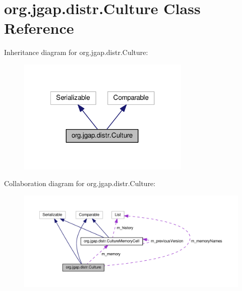 \hypertarget{classorg_1_1jgap_1_1distr_1_1_culture}{\section{org.\-jgap.\-distr.\-Culture Class Reference}
\label{classorg_1_1jgap_1_1distr_1_1_culture}
}


Inheritance diagram for org.\-jgap.\-distr.\-Culture\-:
\nopagebreak
\begin{figure}[H]
\begin{center}
\leavevmode
\includegraphics[width=233pt]{classorg_1_1jgap_1_1distr_1_1_culture__inherit__graph}
\end{center}
\end{figure}


Collaboration diagram for org.\-jgap.\-distr.\-Culture\-:
\nopagebreak
\begin{figure}[H]
\begin{center}
\leavevmode
\includegraphics[width=350pt]{classorg_1_1jgap_1_1distr_1_1_culture__coll__graph}
\end{center}
\end{figure}
